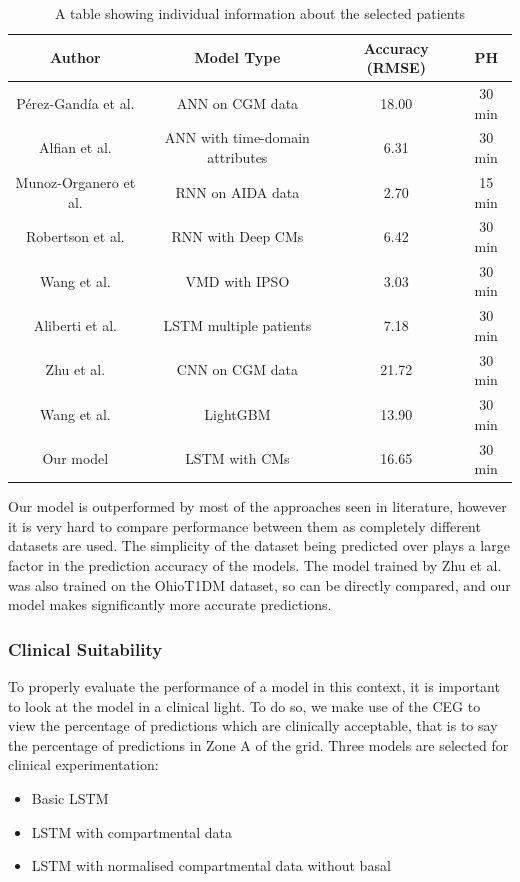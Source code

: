       \begin{table}[H]
        \begin{center}
          \caption{A table showing individual information about the selected patients}
          \begin{tabular}{||c c c c||} 
          \hline
          Author & Model Type & Accuracy (RMSE) & PH \\ [0.5ex] 
          \hline\hline
          Pérez-Gandía et al. \cite{paper3} & ANN on CGM data & 18.00 & 30 min \\ 
          \hline
          Alfian et al. \cite{paper5} & ANN with time-domain attributes & 6.31 & 30 min \\
          \hline
          Munoz-Organero et al. \cite{paper6} & RNN on AIDA data & 2.70 & 15 min \\
          \hline
          Robertson et al. \cite{paper1} & RNN with Deep CMs & 6.42 & 30 min \\
          \hline
          Wang et al. \cite{paper8} & VMD with IPSO & 3.03 & 30 min \\
          \hline
          Aliberti et al. \cite{paper9} & LSTM multiple patients & 7.18 & 30 min \\
          \hline
          Zhu et al. \cite{paper7} & CNN on CGM data & 21.72 & 30 min \\
          \hline
          Wang et al. \cite{paper10} & LightGBM & 13.90 & 30 min \\
          \hline
          Our model & LSTM with CMs & 16.65 & 30 min \\ [1ex]
          \hline 
          \end{tabular}
        \end{center}
      \end{table}

      Our model is outperformed by most of the approaches seen in literature, however it is very hard to compare performance between them as completely different datasets are used. The simplicity of the dataset being predicted over plays a large factor in the prediction accuracy of the models. The model trained by Zhu et al. \cite{paper7} was also trained on the OhioT1DM dataset, so can be directly compared, and our model makes significantly more accurate predictions.

      \subsubsection{Clinical Suitability}
        To properly evaluate the performance of a model in this context, it is important to look at the model in a clinical light. To do so, we make use of the CEG \cite{CEGA} to view the percentage of predictions which are clinically acceptable, that is to say the percentage of predictions in Zone A of the grid. Three models are selected for clinical experimentation:
        \begin{itemize}
          \item Basic LSTM
          \item LSTM with compartmental data
          \item LSTM with normalised compartmental data without basal
        \end{itemize}


